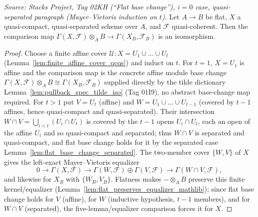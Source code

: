 \begin{lemma}
  \label{lem:flat_base_change_mayer_vietoris}
  \textit{Source: Stacks Project, Tag 02KH (``Flat base change''), $i=0$ case,
  quasi-separated paragraph (Mayer--Vietoris induction on \(t\)).}
  Let \(A \to B\) be flat, \(X\) a quasi-compact, quasi-separated scheme over \(A\),
  and \(\mathcal{F}\) quasi-coherent. Then the comparison map
  \(\Gamma(X,\mathcal{F}) \otimes_A B \to \Gamma(X_B,\mathcal{F}_B)\) is an
  isomorphism.
  \begin{proof}
    Choose a finite affine cover \(\mathcal{U} : X = U_1 \cup \dots \cup U_t\)
    (Lemma~\ref{lem:finite_affine_cover_qcqs}) and induct on \(t\). For \(t = 1\),
    \(X = U_1\) is affine and the comparison map is the concrete affine module base
    change \(\Gamma(X,\mathcal{F})\otimes_A B \cong \Gamma(X_B,\mathcal{F}_B)\) supplied
    directly by the tilde dictionary Lemma~\ref{lem:pullback_spec_tilde_iso} (Tag 01I9),
    no abstract base-change map required. For \(t > 1\) put \(V = U_t\)
    (affine) and \(W = U_1 \cup \dots \cup U_{t-1}\) (covered by \(t-1\) affines, hence
    quasi-compact and quasi-separated). Their intersection \(W \cap V =
    \bigcup_{i<t}(U_i \cap U_t)\) is covered by the \(t-1\) opens \(U_i \cap U_t\), each
    an open of the affine \(U_i\) and so quasi-compact and separated; thus \(W \cap V\)
    is separated and quasi-compact, and flat base change holds for it by the separated
    case Lemma~\ref{lem:flat_base_change_separated}. The two-member cover
    \(\{W, V\}\) of \(X\) gives the left-exact Mayer--Vietoris equalizer
    \[
      0 \to \Gamma(X,\mathcal{F}) \to
        \Gamma(W,\mathcal{F}) \oplus \Gamma(V,\mathcal{F}) \to \Gamma(W\cap V,\mathcal{F}),
    \]
    and likewise for \(X_B\) with \(\{W_B, V_B\}\). Flatness makes \(- \otimes_A B\)
    preserve this finite kernel/equalizer
    (Lemma~\ref{lem:flat_preserves_equalizer_mathlib}); since flat base change holds for
    \(V\) (affine), for \(W\) (inductive hypothesis, \(t-1\) members), and for
    \(W \cap V\) (separated), the five-lemma/equalizer comparison forces it for \(X\).
  \end{proof}
\end{lemma}

